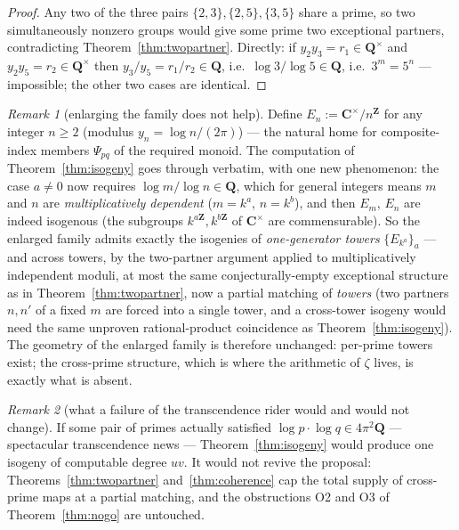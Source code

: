 \documentclass[11pt]{article}
\theoremstyle{definition}
\theoremstyle{remark}
\newtheorem{remark}{Remark}
\newcommand{\Z}{\mathbf{Z}}
\newcommand{\Q}{\mathbf{Q}}
\newcommand{\C}{\mathbf{C}}
\begin{document}
\begin{proof}
Any two of the three pairs $\{2,3\}, \{2,5\}, \{3,5\}$ share a prime, so two
simultaneously nonzero groups would give some prime two exceptional
partners, contradicting Theorem~\ref{thm:twopartner}. Directly: if
$y_2 y_3 = r_1 \in \Q^\times$ and $y_2 y_5 = r_2 \in \Q^\times$ then
$y_3/y_5 = r_1/r_2 \in \Q$, i.e.\ $\log 3/\log 5 \in \Q$, i.e.\
$3^m = 5^n$ --- impossible; the other two cases are identical.
\end{proof}

\begin{remark}[enlarging the family does not help]
\label{rem:enlarge}
Define $E_n := \C^\times/n^\Z$ for any integer $n \geq 2$ (modulus
$y_n = \log n/(2\pi)$) --- the natural home for composite-index members
$\Psi_{pq}$ of the required monoid. The computation of
Theorem~\ref{thm:isogeny} goes through verbatim, with one new phenomenon:
the case $a \neq 0$ now requires $\log m/\log n \in \Q$, which for general
integers means $m$ and $n$ are \emph{multiplicatively dependent}
($m = k^a$, $n = k^b$), and then $E_m$, $E_n$ are indeed isogenous (the
subgroups $k^{a\Z}, k^{b\Z}$ of $\C^\times$ are commensurable). So the
enlarged family admits exactly the isogenies of \emph{one-generator
towers} $\{E_{k^a}\}_a$ --- and across towers, by the two-partner argument
applied to multiplicatively independent moduli, at most the same
conjecturally-empty exceptional structure as in
Theorem~\ref{thm:twopartner}, now a partial matching of \emph{towers} (two
partners $n, n'$ of a fixed $m$ are forced into a single tower, and a
cross-tower isogeny would need the same unproven rational-product
coincidence as Theorem~\ref{thm:isogeny}). The geometry of the enlarged
family is therefore unchanged: per-prime towers exist; the cross-prime
structure, which is where the arithmetic of $\zeta$ lives, is exactly what
is absent.
\end{remark}

\begin{remark}[what a failure of the transcendence rider would and would not
change]
\label{rem:failure}
If some pair of primes actually satisfied
$\log p\cdot\log q \in 4\pi^2\Q$ --- spectacular transcendence news ---
Theorem~\ref{thm:isogeny} would produce one isogeny of computable degree
$uv$. It would not revive the proposal: Theorems~\ref{thm:twopartner}
and~\ref{thm:coherence} cap the total supply of cross-prime maps at a
partial matching, and the obstructions O2 and O3 of Theorem~\ref{thm:nogo}
are untouched.
\end{remark}
\end{document}
